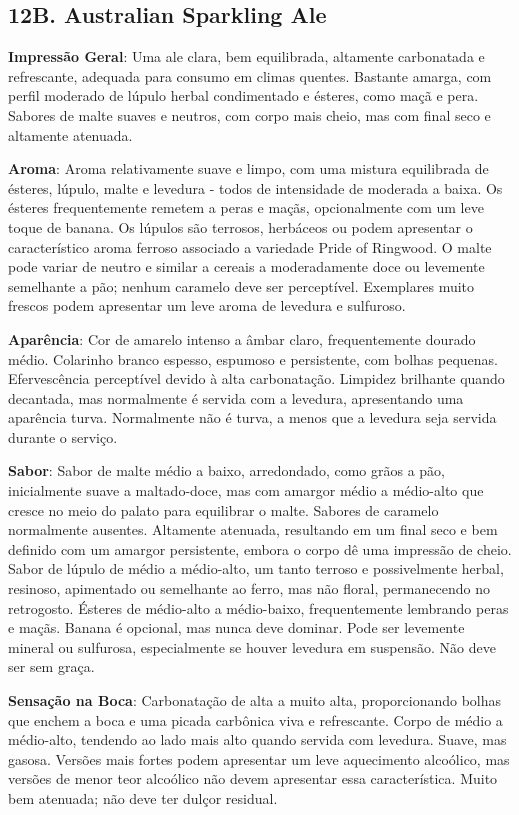 \subsection*{12B. Australian Sparkling Ale}
\textbf{Impressão Geral}: Uma ale clara, bem equilibrada, altamente carbonatada e refrescante, adequada para consumo em climas quentes. Bastante amarga, com perfil moderado de lúpulo herbal condimentado e ésteres, como maçã e pera. Sabores de malte suaves e neutros, com corpo mais cheio, mas com final seco e altamente atenuada.

\textbf{Aroma}: Aroma relativamente suave e limpo, com uma mistura equilibrada de ésteres, lúpulo, malte e levedura - todos de intensidade de moderada a baixa. Os ésteres frequentemente remetem a peras e maçãs, opcionalmente com um leve toque de banana. Os lúpulos são terrosos, herbáceos ou podem apresentar o característico aroma ferroso associado a variedade Pride of Ringwood. O malte pode variar de neutro e similar a cereais a moderadamente doce ou levemente semelhante a pão; nenhum caramelo deve ser perceptível. Exemplares muito frescos podem apresentar um leve aroma de levedura e sulfuroso.

\textbf{Aparência}: Cor de amarelo intenso a âmbar claro, frequentemente dourado médio. Colarinho branco espesso, espumoso e persistente, com bolhas pequenas. Efervescência perceptível devido à alta carbonatação. Limpidez brilhante quando decantada, mas normalmente é servida com a levedura, apresentando uma aparência turva. Normalmente não é turva, a menos que a levedura seja servida durante o serviço.

\textbf{Sabor}: Sabor de malte médio a baixo, arredondado, como grãos a pão, inicialmente suave a maltado-doce, mas com amargor médio a médio-alto que cresce no meio do palato para equilibrar o malte. Sabores de caramelo normalmente ausentes. Altamente atenuada, resultando em um final seco e bem definido com um amargor persistente, embora o corpo dê uma impressão de cheio. Sabor de lúpulo de médio a médio-alto, um tanto terroso e possivelmente herbal, resinoso, apimentado ou semelhante ao ferro, mas não floral, permanecendo no retrogosto. Ésteres de médio-alto a médio-baixo, frequentemente lembrando peras e maçãs. Banana é opcional, mas nunca deve dominar. Pode ser levemente mineral ou sulfurosa, especialmente se houver levedura em suspensão. Não deve ser sem graça.

\textbf{Sensação na Boca}: Carbonatação de alta a muito alta, proporcionando bolhas que enchem a boca e uma picada carbônica viva e refrescante. Corpo de médio a médio-alto, tendendo ao lado mais alto quando servida com levedura. Suave, mas gasosa. Versões mais fortes podem apresentar um leve aquecimento alcoólico, mas versões de menor teor alcoólico não devem apresentar essa característica. Muito bem atenuada; não deve ter dulçor residual.

